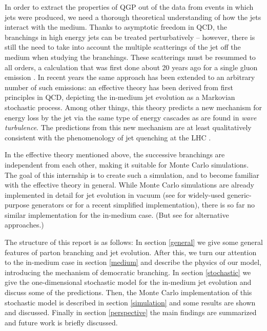 \documentclass[a4paper,12pt]{article}
\numberwithin{equation}{section}
\begin{document}
In order to extract the properties of QGP out of the data from events in which jets were produced, we need a thorough theoretical understanding of how the jets interact with the medium. Thanks to asymptotic freedom in QCD, the branchings in high energy jets can be treated perturbatively -- however, there is still the need to take into account the multiple scatterings of the jet off the medium when studying the branchings. These scatterings must be resummed to all orders, a calculation that was first done about 20 years ago for a single gluon emission \cite{Baier:1996kr,Zakharov:1997uu}. In recent years the same approach has been extended to an arbitrary number of such emissions\cite{Blaizot:2012fh,Blaizot:2013hx}: an effective theory has been derived from first principles in QCD, depicting the in-medium jet evolution as a Markovian stochastic process. Among other things, this theory predicts a new mechanism for energy loss by the jet via the same type of energy cascades as are found in {\em wave turbulence}. The predictions from this new mechanism are at least qualitatively consistent with the phenomenology of jet
quenching at the LHC \cite{Aad:2010bu,Chatrchyan:2011sx}.

In the effective theory mentioned above, the successive branchings are independent from each other, making it suitable for Monte Carlo simulations. The goal of this internship is to create such a simulation, and to become familiar with the effective theory in general. While Monte Carlo simulations are already implemented in detail for jet evolution in vacuum (see \cite{Pythia,Herwig} for widely-used generic-purpose generators or \cite{SmallR} for a recent simplified implementation), there is so far no similar implementation for the in-medium case. (But see \cite{Zapp:2012ak,Schenke:2009gb} for alternative approaches.) 



The structure of this report is as follows: 
In section \ref{general} we give some general features of parton branching and jet evolution. After this, we turn our attention to the in-medium case in section \ref{medium} and describe the physics of our model, introducing the mechanism of democratic branching. In section \ref{stochastic} we give the one-dimensional stochastic model for the in-medium jet evolution and discuss some of the predictions. Then, the Monte Carlo implementation of this stochastic model is described in section \ref{simulation} and some results are shown and discussed. Finally in section \ref{perspective} the main findings are summarized and future work is briefly discussed.
\end{document}
